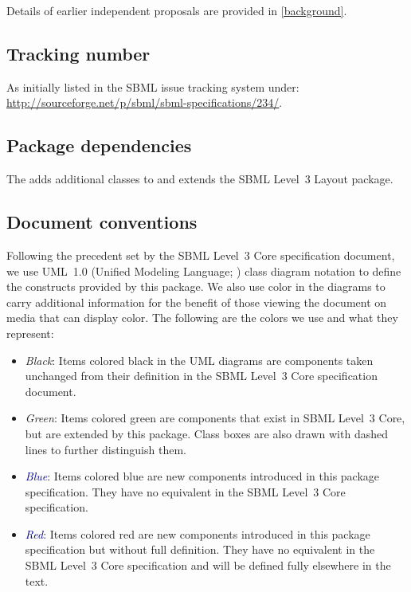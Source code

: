 Details of earlier independent proposals are provided 
in \ref{background}. 

\subsection{Tracking number} 
As initially listed in the SBML issue tracking system under:\\ 
\url{http://sourceforge.net/p/sbml/sbml-specifications/234/}. 

\subsection{Package dependencies} 

The \RenderPackage adds additional classes to \sbmlthreecore and extends the 
SBML Level~3 Layout package. 

\subsection{Document conventions} \label{conventions} 

Following the precedent set by the SBML Level~3 Core specification 
document, we use UML~1.0 (Unified Modeling Language; 
\citealt{eriksson:1998,oestereich:1999}) class diagram notation to 
define the constructs provided by this package. We also use color in the 
diagrams to carry additional information for the benefit of those 
viewing the document on media that can display color. The following are 
the colors we use and what they represent: 

\begin{itemize} 

\item[\raisebox{2.75pt}{\colorbox{black}{\rule{0.8pt}{0.8pt}}}] 
\emph{Black}: Items colored black in the UML diagrams are components 
taken unchanged from their definition in the SBML Level~3 Core 
specification document. 

\item[\raisebox{2.75pt}{\colorbox{mediumgreen}{\rule{0.8pt}{0.8pt}}}] 
\emph{\textcolor{mediumgreen}{Green}}: Items colored green are 
components that exist in SBML Level~3 Core, but are extended by this 
package. Class boxes are also drawn with dashed lines to further 
distinguish them. 

\item[\raisebox{2.75pt}{\colorbox{darkblue}{\rule{0.8pt}{0.8pt}}}] 
\emph{\textcolor{darkblue}{Blue}}: Items colored blue are new components 
introduced in this package specification. They have no equivalent in the 
SBML Level~3 Core specification. 

\item[\raisebox{2.75pt}{\colorbox{red}{\rule{0.8pt}{0.8pt}}}] 
\emph{\textcolor{darkblue}{Red}}: Items colored red are new components 
introduced in this package specification but without full definition. They have no equivalent in the 
SBML Level~3 Core specification and will be defined fully elsewhere in the text.
\end{itemize} 

